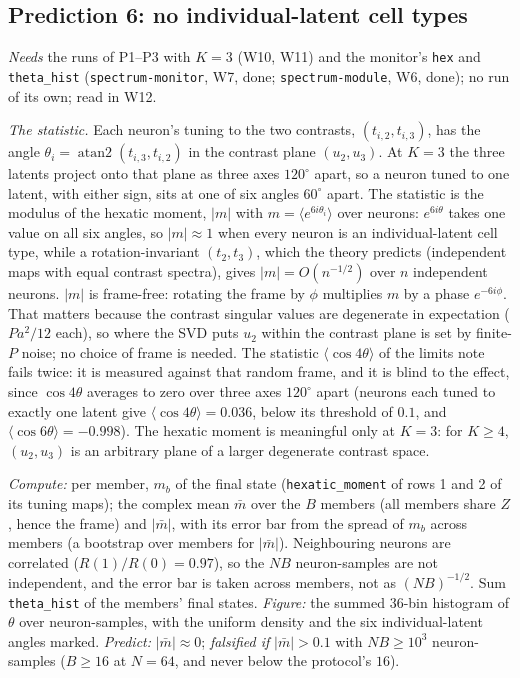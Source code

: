 \documentclass[11pt,a4paper]{article}
\newcommand{\code}[1]{\texttt{#1}}
\begin{document}
\subsection{Prediction 6: no individual-latent cell types}
\label{sec:P6}
\emph{Needs} the runs of P1--P3 with $K = 3$ (W10, W11) and the monitor's \code{hex} and \code{theta\_hist} (\code{spectrum-monitor}, W7, done; \code{spectrum-module}, W6, done); no run of its own; read in W12.

\emph{The statistic.} Each neuron's tuning to the two contrasts, $(t_{i,2}, t_{i,3})$, has the angle $\theta_i = \operatorname{atan2}(t_{i,3}, t_{i,2})$ in the contrast plane $(u_2, u_3)$. At $K = 3$ the three latents project onto that plane as three axes $120^\circ$ apart, so a neuron tuned to one latent, with either sign, sits at one of six angles $60^\circ$ apart. The statistic is the modulus of the hexatic moment, $|m|$ with $m = \langle e^{6i\theta_i}\rangle$ over neurons: $e^{6i\theta}$ takes one value on all six angles, so $|m|\approx1$ when every neuron is an individual-latent cell type, while a rotation-invariant $(t_2, t_3)$, which the theory predicts (independent maps with equal contrast spectra), gives $|m| = O(n^{-1/2})$ over $n$ independent neurons. $|m|$ is frame-free: rotating the frame by $\phi$ multiplies $m$ by a phase $e^{-6i\phi}$. That matters because the contrast singular values are degenerate in expectation ($Pa^2/12$ each), so where the SVD puts $u_2$ within the contrast plane is set by finite-$P$ noise; no choice of frame is needed. The statistic $\langle\cos4\theta\rangle$ of the limits note fails twice: it is measured against that random frame, and it is blind to the effect, since $\cos4\theta$ averages to zero over three axes $120^\circ$ apart (neurons each tuned to exactly one latent give $\langle\cos4\theta\rangle = 0.036$, below its threshold of $0.1$, and $\langle\cos6\theta\rangle = -0.998$). The hexatic moment is meaningful only at $K = 3$: for $K\ge4$, $(u_2, u_3)$ is an arbitrary plane of a larger degenerate contrast space.

\emph{Compute:} per member, $m_b$ of the final state (\code{hexatic\_moment} of rows 1 and 2 of its tuning maps); the complex mean $\bar m$ over the $B$ members (all members share $Z$, hence the frame) and $|\bar m|$, with its error bar from the spread of $m_b$ across members (a bootstrap over members for $|\bar m|$). Neighbouring neurons are correlated ($R(1)/R(0) = 0.97$), so the $NB$ neuron-samples are not independent, and the error bar is taken across members, not as $(NB)^{-1/2}$. Sum \code{theta\_hist} of the members' final states. \emph{Figure:} the summed 36-bin histogram of $\theta$ over neuron-samples, with the uniform density and the six individual-latent angles marked. \emph{Predict:} $|\bar m|\approx0$; \emph{falsified if} $|\bar m| > 0.1$ with $NB\ge10^3$ neuron-samples ($B\ge16$ at $N = 64$, and never below the protocol's $16$).
\end{document}
